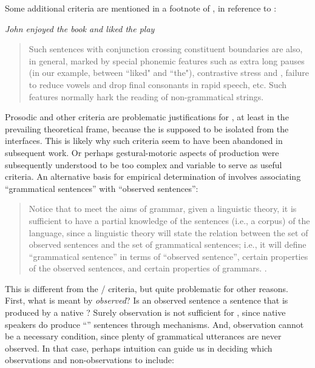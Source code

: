 Some additional  criteria are mentioned in a footnote of \citet{Chomsky1957}, in reference to :

\ea\label{ex:6:4}
\textit{John enjoyed the book and liked the play}
\z

\begin{quote}
Such sentences with conjunction crossing constituent boundaries are also, in general, marked by special phonemic features such as extra long pauses (in our example, between ``liked" and ``the"), contrastive stress and , failure to reduce vowels and drop final consonants in rapid speech, etc. Such features normally hark the reading of non-grammatical strings. \citep[35-36]{Chomsky1957}
\end{quote}

Prosodic and other  criteria are problematic justifications for \linebreak{}, at least in the prevailing theoretical frame, because the  is supposed to be isolated from the  interfaces. This is likely why such criteria seem to have been abandoned in subsequent work. Or perhaps gestural-motoric aspects of production were subsequently understood to be too complex and variable to serve as useful criteria. An alternative basis for empirical determination of  involves associating “grammatical sentences” with “observed sentences”:

\begin{quote}	
  Notice that to meet the aims of grammar, given a linguistic theory, it is sufficient to have a partial knowledge of the sentences (i.e., a corpus) of the language, since a linguistic theory will state the relation between the set of observed sentences and the set of grammatical sentences; i.e., it will define “grammatical sentence” in terms of “observed sentence”, certain properties of the observed sentences, and certain properties of grammars. \citep[14]{Chomsky1957}.
\end{quote}

  This is different from the / criteria, but quite problematic for other reasons. First, what is meant by \textit{observed}? Is an observed sentence a sentence that is produced by a native ? Surely observation is not sufficient for , since native speakers do produce “” sentences through  mechanisms. And, observation cannot be a necessary condition, since plenty of grammatical utterances are never observed. In that case, perhaps intuition can guide us in deciding which observations and non-observations to include:
  
